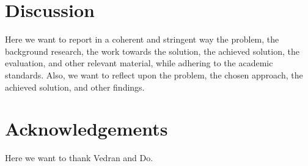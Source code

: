\documentclass[11pt]{article}
\begin{document}
    \lipsum[1-1]

    \section{Discussion}
    Here we want to report in a coherent and stringent way the problem, the background research, the work towards the solution, the achieved solution, the evaluation, and other relevant material, while adhering to the academic standards.
    Also, we want to reflect upon the problem, the chosen approach, the achieved solution, and other findings.
    
    \lipsum[1-1]
    
    \section{Acknowledgements}
    Here we want to thank Vedran and Do.

    \printbibheading
    \printbibliography[type=article,heading=subbibliography,title={Articles}]
    \printbibliography[type=misc,heading=subbibliography,title={Datasets}]
\end{document}

